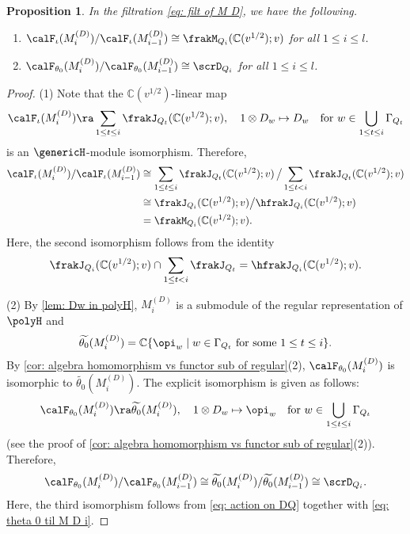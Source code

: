 \documentclass[12pt, reqno]{amsart}
\theoremstyle{plain}
\newtheorem{proposition}[proposition]{Proposition}
\theoremstyle{definition}
\numberwithin{equation}{section}
\numberwithin{figure}{section}
\numberwithin{table}{section}
\def\C{\mathbb C}
\begin{document}
\begin{proposition}\label{prop: filt of MnD}
In the filtration \cref{eq: filt of M D}, we have the following.
\begin{enumerate}[label = {\rm (\arabic*)}]
\item  $\calF_{\iota}(M^{(D)}_i) / \calF_{\iota}(M^{(D)}_{i-1}) \cong \frakM_{Q_i}(\C(v^{1/2});v)$ for all $1 \leq i \leq l$.
\item $\calF_{\theta_0}(M^{(D)}_i) / 
\calF_{\theta_0}(M^{(D)}_{i-1}) \cong \scrD_{Q_i}$ for all $1 \leq i \leq l$.
\end{enumerate}
\end{proposition}
\begin{proof}
(1) Note that  the $\C(v^{1/2})$-linear map
\[
\calF_\iota(M^{(D)}_i) \ra \sum_{1 \leq t \leq i} \frakJ_{Q_t}(\C(v^{1/2});v), \quad 1 \otimes D_w \mapsto D_w
\quad
\text{for $w \in \bigcup_{1 \leq t \leq i} \Gamma_{Q_t}$}
\]
is an $\genericH$-module isomorphism.
Therefore,  
\begin{align*}
\calF_\iota(M^{(D)}_i) / \calF_{\iota}(M^{(D)}_{i-1}) 
& \cong \sum_{1 \leq t \leq i} \frakJ_{Q_t}(\C(v^{1/2});v) \, \big/  \sum_{1 \leq t < i} \frakJ_{Q_t}(\C(v^{1/2});v) \\
& \cong \frakJ_{Q_i}(\C(v^{1/2});v) \big/ \hfrakJ_{Q_i}(\C(v^{1/2});v) 
\\& = \frakM_{Q_i}(\C(v^{1/2});v).
\end{align*}
Here, the second isomorphism follows from the identity
\[
\frakJ_{Q_i}(\C(v^{1/2});v) \cap \sum_{1 \leq t < i} \frakJ_{Q_t} = \hfrakJ_{Q_i}(\C(v^{1/2});v).
\]

(2) By  \cref{lem: Dw in polyH}, $M^{(D)}_i$ is a submodule of the regular representation of $\polyH$ and  
\begin{align}\label{eq: theta 0  til M D i}
 \widetilde{\theta_0}(M^{(D)}_i) =  \C\{\opi_w \mid w \in \Gamma_{Q_t}  \text{ for some $1 \leq t \leq i$} \}.
\end{align}
By \cref{cor: algebra homomorphism vs functor sub of regular}(2),  $\calF_{\theta_0}(M^{(D)}_i)$ is isomorphic to $\widetilde{\theta_0}(M^{(D)}_i)$.
The explicit isomorphism is given as follows:
\[
\calF_{\theta_0}(M^{(D)}_i) \ra \widetilde{\theta_0}(M^{(D)}_i), \quad 1 \otimes D_w \mapsto \opi_w
\quad
\text{for $w \in \bigcup_{1 \leq t \leq i} \Gamma_{Q_t}$}
\]
(see the proof of \cref{cor: algebra homomorphism vs functor sub of regular}(2)).
Therefore, 
\[
\calF_{\theta_0}(M^{(D)}_i) / 
\calF_{\theta_0}(M^{(D)}_{i-1}) \cong \widetilde{\theta_0}(M^{(D)}_i)/\widetilde{\theta_0}(M^{(D)}_{i-1}) \cong \scrD_{Q_i}.
\]
Here, the third isomorphism follows from  \cref{eq: action on DQ} together with \cref{eq: theta 0  til M D i}.
\end{proof}
\end{document}
